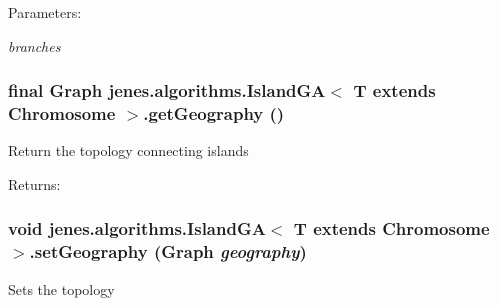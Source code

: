 \begin{Desc}
\item[Parameters:]
\begin{description}
\item[{\em branches}]\end{description}
\end{Desc}
\hypertarget{classjenes_1_1algorithms_1_1_island_g_a_3_01_t_01extends_01_chromosome_01_4_36fb81c40aa049fc4af4c5a8ebdbc9e6}{
\subsubsection[getGeography]{\setlength{\rightskip}{0pt plus 5cm}final Graph jenes.algorithms.IslandGA$<$ T extends Chromosome $>$.getGeography ()}}
\label{classjenes_1_1algorithms_1_1_island_g_a_3_01_t_01extends_01_chromosome_01_4_36fb81c40aa049fc4af4c5a8ebdbc9e6}


Return the topology connecting islands

\begin{Desc}
\item[Returns:]\end{Desc}
\hypertarget{classjenes_1_1algorithms_1_1_island_g_a_3_01_t_01extends_01_chromosome_01_4_c40da22bb9de811c6a2712a67184dc06}{
\subsubsection[setGeography]{\setlength{\rightskip}{0pt plus 5cm}void jenes.algorithms.IslandGA$<$ T extends Chromosome $>$.setGeography (Graph {\em geography})}}
\label{classjenes_1_1algorithms_1_1_island_g_a_3_01_t_01extends_01_chromosome_01_4_c40da22bb9de811c6a2712a67184dc06}


Sets the topology


